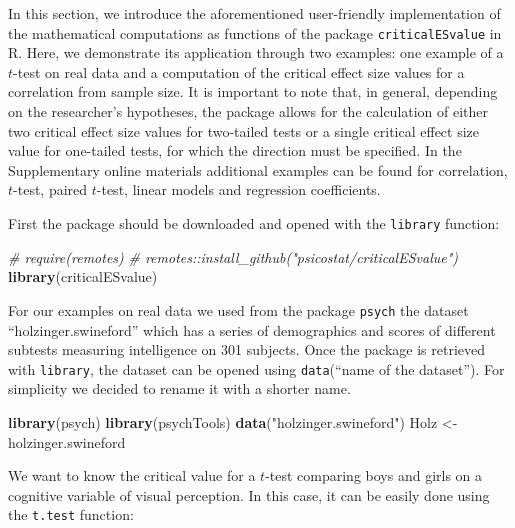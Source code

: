 \documentclass[
  man,floatsintext]{apa7}
\newenvironment{Shaded}{\begin{snugshade}}{\end{snugshade}}
\newcommand{\CommentTok}[1]{\textcolor[rgb]{0.56,0.35,0.01}{\textit{#1}}}
\newcommand{\FunctionTok}[1]{\textcolor[rgb]{0.13,0.29,0.53}{\textbf{#1}}}
\newcommand{\NormalTok}[1]{#1}
\newcommand{\OtherTok}[1]{\textcolor[rgb]{0.56,0.35,0.01}{#1}}
\newcommand{\StringTok}[1]{\textcolor[rgb]{0.31,0.60,0.02}{#1}}
\begin{document}
In this section, we introduce the aforementioned user-friendly implementation of the mathematical computations as functions of the package \texttt{criticalESvalue} in R. Here, we demonstrate its application through two examples: one example of a \(t\)-test on real data and a computation of the critical effect size values for a correlation from sample size. It is important to note that, in general, depending on the researcher's hypotheses, the package allows for the calculation of either two critical effect size values for two-tailed tests or a single critical effect size value for one-tailed tests, for which the direction must be specified. In the Supplementary online materials additional examples can be found for correlation, \(t\)-test, paired \(t\)-test, linear models and regression coefficients.

First the package should be downloaded and opened with the \texttt{library} function:

\footnotesize

\begin{Shaded}
\begin{Highlighting}[]
\CommentTok{\# require(remotes)}
\CommentTok{\# remotes::install\_github("psicostat/criticalESvalue")}
\FunctionTok{library}\NormalTok{(criticalESvalue)}
\end{Highlighting}
\end{Shaded}

\normalsize

For our examples on real data we used from the package \texttt{psych} the dataset ``holzinger.swineford'' which has a series of demographics and scores of different subtests measuring intelligence on 301 subjects. Once the package is retrieved with \texttt{library}, the dataset can be opened using \texttt{data}(``name of the dataset''). For simplicity we decided to rename it with a shorter name.

\footnotesize

\begin{Shaded}
\begin{Highlighting}[]
\FunctionTok{library}\NormalTok{(psych)}
\FunctionTok{library}\NormalTok{(psychTools)}
\FunctionTok{data}\NormalTok{(}\StringTok{"holzinger.swineford"}\NormalTok{)}
\NormalTok{Holz }\OtherTok{\textless{}{-}}\NormalTok{ holzinger.swineford}
\end{Highlighting}
\end{Shaded}

\normalsize

We want to know the critical value for a \(t\)-test comparing boys and girls on a cognitive variable of visual perception. In this case, it can be easily done using the \texttt{t.test} function:
\end{document}
